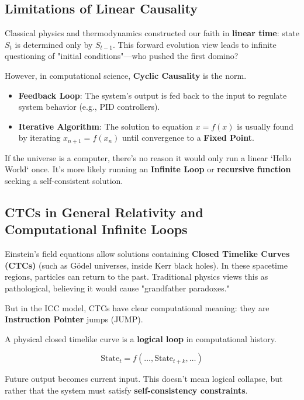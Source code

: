 \subsection{Limitations of Linear Causality}

Classical physics and thermodynamics constructed our faith in \textbf{linear time}: state $S_{t}$ is determined only by $S_{t-1}$. This forward evolution view leads to infinite questioning of "initial conditions"—who pushed the first domino?

However, in computational science, \textbf{Cyclic Causality} is the norm.

\begin{itemize}
\item \textbf{Feedback Loop}: The system's output is fed back to the input to regulate system behavior (e.g., PID controllers).

\item \textbf{Iterative Algorithm}: The solution to equation $x = f(x)$ is usually found by iterating $x_{n+1} = f(x_n)$ until convergence to a \textbf{Fixed Point}.
\end{itemize}

If the universe is a computer, there's no reason it would only run a linear `Hello World` once. It's more likely running an \textbf{Infinite Loop} or \textbf{recursive function} seeking a self-consistent solution.

\subsection{CTCs in General Relativity and Computational Infinite Loops}

Einstein's field equations allow solutions containing \textbf{Closed Timelike Curves (CTCs)} (such as Gödel universes, inside Kerr black holes). In these spacetime regions, particles can return to the past. Traditional physics views this as pathological, believing it would cause "grandfather paradoxes."

But in the ICC model, CTCs have clear computational meaning: they are \textbf{Instruction Pointer} jumps (JUMP).

\begin{definition}
A physical closed timelike curve is a \textbf{logical loop} in computational history.

\begin{equation}
\text{State}_{t} = f(\dots, \text{State}_{t+k}, \dots)
\end{equation}

Future output becomes current input. This doesn't mean logical collapse, but rather that the system must satisfy \textbf{self-consistency constraints}.
\end{definition}

